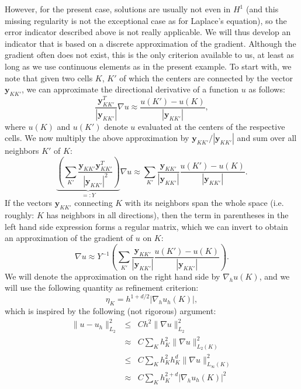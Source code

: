 \documentclass{article}
\renewcommand{\vec}[1]{{\mathbf #1}}
\begin{document}
However, for the present case, solutions are usually not even in $H^1$
(and this missing regularity is not the exceptional case as for
Laplace's equation), so the error indicator described above is not
really applicable. We will thus develop an indicator that is based on
a discrete approximation of the gradient. Although the gradient often
does not exist, this is the only criterion available to us, at least
as long as we use continuous elements as in the present
example. To start with, we note that given two cells $K$, $K'$ of
which the centers are connected by the vector $\vec y_{KK'}$, we can
approximate the directional derivative of a function $u$ as follows:
$$
  \frac{\vec y_{KK'}^T}{|\vec y_{KK'}|} \nabla u
  \approx
  \frac{u(K') - u(K)}{|\vec y_{KK'}|},
$$
where $u(K)$ and $u(K')$ denote $u$ evaluated at the centers of the
respective cells. We now multiply the above approximation by 
$\vec y_{KK'}/|\vec y_{KK'}|$ and sum over all neighbors $K'$ of $K$:
$$
  \underbrace{
    \left(\sum_{K'} \frac{\vec y_{KK'} \vec y_{KK'}^T}
                         {|\vec y_{KK'}|^2}\right)}_{=:Y}
  \nabla u
  \approx
  \sum_{K'}
  \frac{\vec y_{KK'}}{|\vec y_{KK'}|}
  \frac{u(K') - u(K)}{|\vec y_{KK'}|}.
$$
If the vectors $\vec y_{KK'}$ connecting $K$ with its neighbors span
the whole space (i.e. roughly: $K$ has neighbors in all directions),
then the term in parentheses in the left hand side expression forms a
regular matrix, which we can invert to obtain an approximation of the
gradient of $u$ on $K$:
$$
  \nabla u
  \approx
  Y^{-1}
  \left(
    \sum_{K'}
    \frac{\vec y_{KK'}}{|\vec y_{KK'}|}
    \frac{u(K') - u(K)}{|\vec y_{KK'}|}
  \right).
$$
We will denote the approximation on the right hand side by
$\nabla_h u(K)$, and we will use the following quantity as refinement
criterion:
$$
  \eta_K = h^{1+d/2} |\nabla_h u_h(K)|,
$$
which is inspired by the following (not rigorous) argument:
\begin{eqnarray*}
  \|u-u_h\|^2_{L_2} 
  &\le&
  C h^2 \|\nabla u\|^2_{L_2}
\\
  &\approx&
  C
  \sum_K
  h_K^2 \|\nabla u\|^2_{L_2(K)}
\\
  &\le&
  C
  \sum_K
  h_K^2 h_K^d \|\nabla u\|^2_{L_\infty(K)}
\\
  &\approx&
  C
  \sum_K
  h_K^{2+d} |\nabla_h u_h(K)|^2
\end{eqnarray*}
\end{document}
